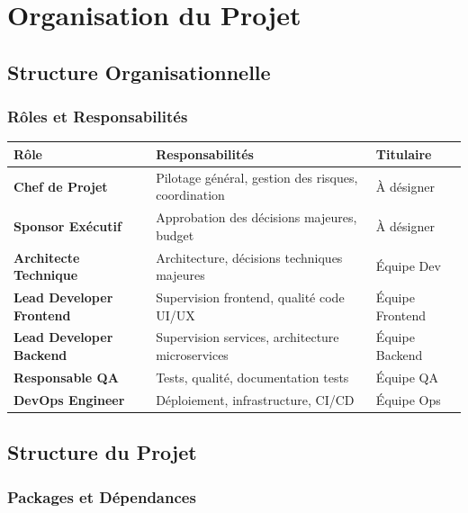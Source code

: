 \documentclass[12pt,a4paper,french]{report}
\begin{document}
\chapter{Organisation du Projet}

\section{Structure Organisationnelle}

\subsection{Rôles et Responsabilités}

\begin{table}[H]
\centering
\begin{tabularx}{\textwidth}{|l|X|X|}
\hline
\rowcolor{LightGray}
\textbf{Rôle} & \textbf{Responsabilités} & \textbf{Titulaire} \\
\hline
\textbf{Chef de Projet} & Pilotage général, gestion des risques, coordination & À désigner \\
\hline
\textbf{Sponsor Exécutif} & Approbation des décisions majeures, budget & À désigner \\
\hline
\textbf{Architecte Technique} & Architecture, décisions techniques majeures & Équipe Dev \\
\hline
\textbf{Lead Developer Frontend} & Supervision frontend, qualité code UI/UX & Équipe Frontend \\
\hline
\textbf{Lead Developer Backend} & Supervision services, architecture microservices & Équipe Backend \\
\hline
\textbf{Responsable QA} & Tests, qualité, documentation tests & Équipe QA \\
\hline
\textbf{DevOps Engineer} & Déploiement, infrastructure, CI/CD & Équipe Ops \\
\hline
\end{tabularx}
\end{table}

\section{Structure du Projet}

\subsection{Packages et Dépendances}
\end{document}
